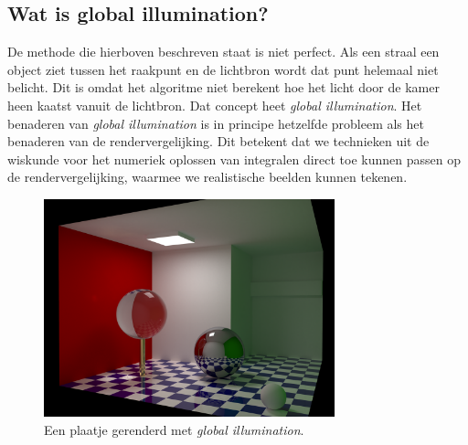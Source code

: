 \documentclass[12pt, a4paper]{article}
\begin{document}
\subsection{Wat is global illumination?}
De methode die hierboven beschreven staat is niet perfect. Als een straal een object ziet tussen het raakpunt en de lichtbron wordt dat punt helemaal niet belicht. Dit is omdat het algoritme niet berekent hoe het licht door de kamer heen kaatst vanuit de lichtbron. Dat concept heet \emph{global illumination}. Het benaderen van \emph{global illumination} is in principe hetzelfde probleem als het benaderen van de rendervergelijking. Dit betekent dat we technieken uit de wiskunde voor het numeriek oplossen van integralen direct toe kunnen passen op de rendervergelijking, waarmee we realistische beelden kunnen tekenen. 

\begin{figure}[h]
    \centering
    \includegraphics[width=0.75\textwidth]{global_illumination.png}
    \caption{Een plaatje gerenderd met \emph{global illumination}.}
    \label{fig:global_illumination}
\end{figure}
\end{document}
